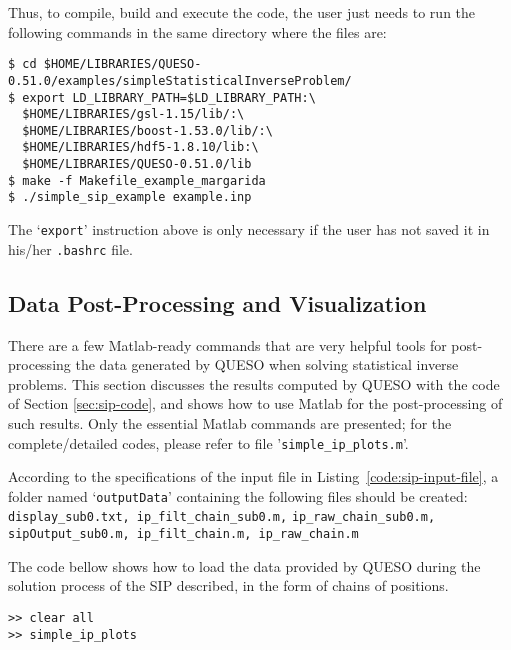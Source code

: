 Thus, to compile, build and execute the code, the user just needs to run the following commands in the same directory where the files are:
\begin{lstlisting}
$ cd $HOME/LIBRARIES/QUESO-0.51.0/examples/simpleStatisticalInverseProblem/
$ export LD_LIBRARY_PATH=$LD_LIBRARY_PATH:\
  $HOME/LIBRARIES/gsl-1.15/lib/:\
  $HOME/LIBRARIES/boost-1.53.0/lib/:\
  $HOME/LIBRARIES/hdf5-1.8.10/lib:\
  $HOME/LIBRARIES/QUESO-0.51.0/lib 
$ make -f Makefile_example_margarida 
$ ./simple_sip_example example.inp
\end{lstlisting}

The `\verb+export+' instruction above is only necessary if the user has not saved it in his/her \verb+.bashrc+ file. 


\subsection{Data Post-Processing and Visualization}\label{sec:sip-results}


There are a few Matlab-ready commands that are very helpful tools for post-processing the data generated by QUESO when solving statistical inverse problems. This section discusses the results computed by QUESO with the code of Section \ref{sec:sip-code}, and shows how to use Matlab for the post-processing of such results. Only the essential Matlab commands are presented; for the complete/detailed codes, please refer to file '\verb+simple_ip_plots.m+'.

According to the specifications of the input file in Listing~\ref{code:sip-input-file}, a folder named `\verb+outputData+' containing the following files should be created: \verb+display_sub0.txt, ip_filt_chain_sub0.m,+ \verb+ip_raw_chain_sub0.m, sipOutput_sub0.m, ip_filt_chain.m, ip_raw_chain.m+


The code bellow shows how to load the data provided by QUESO during the solution process of the SIP described, in the form of 
chains of positions.

\begin{lstlisting}[caption={Matlab code for loading the data in both raw and filtered chains of the SIP, by calling the file \texttt{simple\_ip\_plots.m}.}]
% inside Matlab
>> clear all
>> simple_ip_plots
\end{lstlisting}


